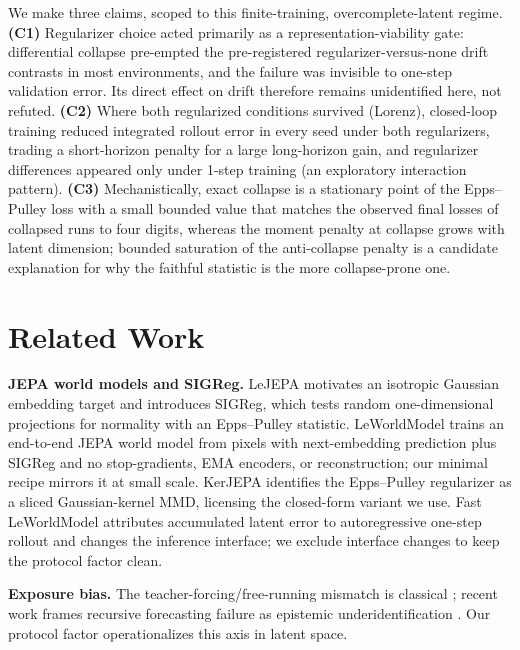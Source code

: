 \documentclass{article}
\begin{document}
We make three claims, scoped to this finite-training, overcomplete-latent regime. \textbf{(C1)} Regularizer choice acted primarily as a representation-viability gate: differential collapse pre-empted the pre-registered regularizer-versus-none drift contrasts in most environments, and the failure was invisible to one-step validation error. Its direct effect on drift therefore remains unidentified here, not refuted. \textbf{(C2)} Where both regularized conditions survived (Lorenz), closed-loop training reduced integrated rollout error in every seed under both regularizers, trading a short-horizon penalty for a large long-horizon gain, and regularizer differences appeared only under 1-step training (an exploratory interaction pattern). \textbf{(C3)} Mechanistically, exact collapse is a stationary point of the Epps--Pulley loss with a small bounded value that matches the observed final losses of collapsed runs to four digits, whereas the moment penalty at collapse grows with latent dimension; bounded saturation of the anti-collapse penalty is a candidate explanation for why the faithful statistic is the more collapse-prone one.

\section{Related Work}
\label{sec:related}

\textbf{JEPA world models and SIGReg.} LeJEPA \citep{balestriero2025lejepa} motivates an isotropic Gaussian embedding target and introduces SIGReg, which tests random one-dimensional projections for normality with an Epps--Pulley statistic. LeWorldModel \citep{maes2026lewm} trains an end-to-end JEPA world model from pixels with next-embedding prediction plus SIGReg and no stop-gradients, EMA encoders, or reconstruction; our minimal recipe mirrors it at small scale. KerJEPA \citep{zimmermann2025kerjepa} identifies the Epps--Pulley regularizer as a sliced Gaussian-kernel MMD, licensing the closed-form variant we use. Fast LeWorldModel \citep{gao2026fastlewm} attributes accumulated latent error to autoregressive one-step rollout and changes the inference interface; we exclude interface changes to keep the protocol factor clean.

\textbf{Exposure bias.} The teacher-forcing/free-running mismatch is classical \citep{lamb2016professor}; recent work frames recursive forecasting failure as epistemic underidentification \citep{green2026exposure}. Our protocol factor operationalizes this axis in latent space.
\end{document}
